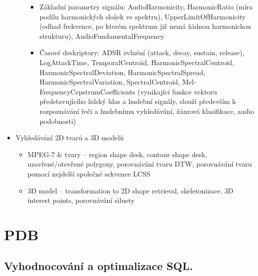 \documentclass[a4paper,hidelinks]{article}
\begin{document}
\begin{itemize}
\begin{itemize}
\begin{itemize}
            \item Základní parametry signálu: AudioHarmonicity, HarmonicRatio (míra podílu harmonických složek ve spektru), UpperLimitOfHarmonicity (odhad frekvence, po kterém spektrum již nemá žádnou harmonickou strukturu), AudioFundamentalFrequency
            \item Časové deskriptory: ADSR zvlnění (attack, decay, sustain, release), LogAttackTime, TemporalCentroid, HarmonicSpectralCentroid, HarmonicSpectralDeviation, HarmonicSpectralSpread, HarmonicSpectralVariation, SpectralCentroid, Mel-FrequencyCepstrumCoefficients (vynikající funkce vektoru představujícího lidský hlas a hudební signály, slouží především k rozpoznávání řeči a hudebnímu vyhledávání, žánrová klasifikace, audio podobnosti)
        \end{itemize}    
    \end{itemize}    
    \item Vyhledávání 2D tvarů a 3D modelů
    \begin{itemize}
        \item MPEG-7 \& tvary -- region shape desk, contour shape desk, uzavřené/otevřené polygony, porovnávání tvaru DTW, porovnávání tvaru pomocí nejdelší společné sekvence LCSS
        \item 3D model -- transformation to 2D shape retrieval, skeletonizace, 3D interest points, porovnávání siluety
    \end{itemize}
\end{itemize}



\section{PDB}

\subsection{Vyhodnocování a optimalizace SQL.}
\end{document}
